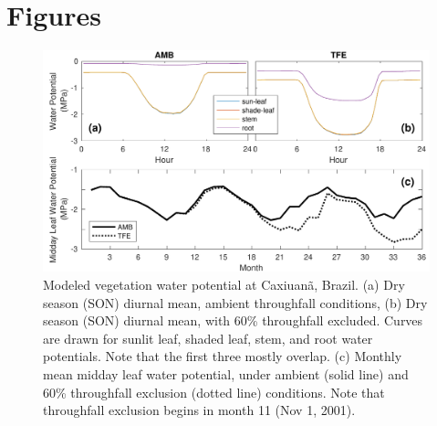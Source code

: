 \documentclass[draft,linenumbers]{agujournal}
\begin{document}
\section{Figures}
  \begin{figure}[h]
     \centering
     \includegraphics[width=30pc]{../figs2/fig2.pdf}
     \caption{Modeled vegetation water potential at  Caxiuan\~a, Brazil.
     (a) Dry season (SON) diurnal mean, ambient throughfall conditions,
     (b) Dry season (SON) diurnal mean, with 60\% throughfall excluded.
     Curves are drawn for sunlit leaf, shaded leaf, stem, and root water potentials. Note that the first three mostly overlap.
     (c) Monthly mean midday leaf water potential, under ambient (solid line) and 60\% throughfall exclusion (dotted line) conditions.
     Note that throughfall exclusion begins in month 11 (Nov 1, 2001).
     }
     \label{fig:vwp}
  \end{figure}
  
\end{document}
